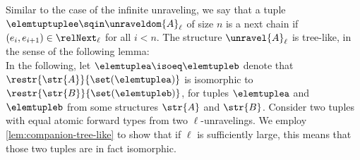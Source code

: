 \noindent
Similar to the case of the infinite unraveling, we say that a tuple $\elemtuptuplee \sqin \unraveldom{A}_{\ell}$ of size $n$ is a next chain if $(e_{i}, e_{i+1}) \in \relNext_{\ell}$ for all $i < n$. The structure $\unravel{A}_{\ell}$ is tree-like, in the sense of the following lemma:\\[-1ex]


\noindent
In the following, let $\elemtuplea \isoeq \elemtupleb$ denote that $\restr{\str{A}}{\set(\elemtuplea)}$ is isomorphic to $\restr{\str{B}}{\set(\elemtupleb)}$, for tuples $\elemtuplea$ and $\elemtupleb$ from some structures $\str{A}$ and $\str{B}$.
Consider two tuples with equal atomic forward types from two $\ell$-unravelings.
We employ \cref{lem:companion-tree-like} to show that if $\ell$ is sufficiently large, this means that those two tuples are in fact isomorphic.


